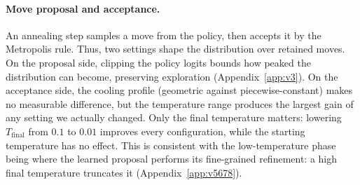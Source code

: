 \documentclass[letterpaper]{article} %
\begin{document}


\paragraph{Move proposal and acceptance.}
An annealing step samples a move from the policy, then accepts it by
the Metropolis rule. Thus, two settings shape the distribution over
retained moves. On the proposal side, clipping the policy logits bounds
how peaked the distribution can become, preserving exploration (Appendix~\ref{app:v3}). 
On the acceptance side, the cooling profile (geometric against piecewise-constant) makes no
measurable difference, but the temperature range produces the largest
gain of any setting we actually changed. Only the final temperature
matters: lowering $T_{\mathrm{final}}$ from $0.1$ to $0.01$ improves
every configuration, while the starting temperature has no effect. This
is consistent with the low-temperature phase being where the learned
proposal performs its fine-grained refinement: a high final temperature
truncates it (Appendix~\ref{app:v5678}).


\end{document}
